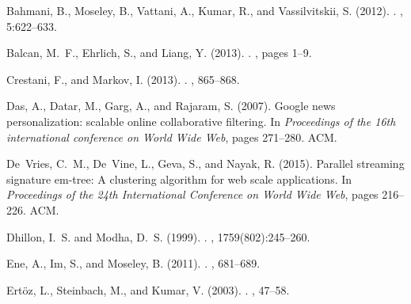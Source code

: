 \documentclass[10pt]{article}
\begin{document}
\newpage

% 
\begin{thebibliography}{}

Bahmani, B., Moseley, B., Vattani, A., Kumar, R., and Vassilvitskii, S. (2012).
.
, 5:622--633.

Balcan, M.~F., Ehrlich, S., and Liang, Y. (2013).
.
, pages 1--9.

Crestani, F., and Markov, I. (2013).
.
, 865--868.

Das, A., Datar, M., Garg, A., and Rajaram, S. (2007).
\newblock Google news personalization: scalable online collaborative filtering.
\newblock In {\em Proceedings of the 16th international conference on World
  Wide Web}, pages 271--280. ACM.

De~Vries, C.~M., De~Vine, L., Geva, S., and Nayak, R. (2015).
\newblock Parallel streaming signature em-tree: A clustering algorithm for web
  scale applications.
\newblock In {\em Proceedings of the 24th International Conference on World
  Wide Web}, pages 216--226. ACM.

Dhillon, I.~S. and Modha, D.~S. (1999).
.
, 1759(802):245--260.

Ene, A., Im, S., and Moseley, B. (2011).
.
, 681--689.

Ert{\"o}z, L., Steinbach, M., and Kumar, V. (2003).
.
, 47--58.



\end{thebibliography}
\end{document}
